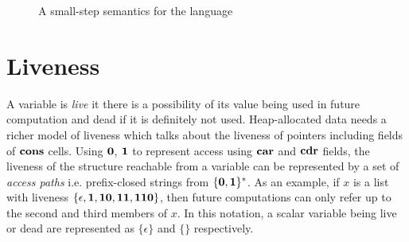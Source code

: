 \documentclass{sig-alternate}
\begin{document}
\begin{figure*}[t!]
\begin{center}
\caption{A small-step semantics for the language}\label{fig:lang-semantics}
\end{center}
\end{figure*}


\renewcommand{\pp}[2]{\ensuremath{#1\!\!:\!#2}} %


\section{Liveness}\label{sec:liveness}

A variable is {\em live} it  there is a possibility of its value being
used  in future computation  and dead  if it  is definitely  not used.
Heap-allocated data needs a richer model of liveness which talks about
the  liveness of pointers  including fields  of $\mbox{$\mathbf{cons}$}$  cells.  Using
$\mathbf{0}$, $\mathbf{1}$  to represent access using $\mbox{$\mathbf{car}$}$  and $\mbox{$\mathbf{cdr}$}$ fields,
the  liveness  of the  structure  reachable  from  a variable  can  be
represented by a set of {\em access paths} i.e.  prefix-closed strings
from $\{\mathbf{0},\mathbf{1}\}^\ast$.   As an  example, if $x$  is a  list with
liveness      $\{\epsilon,     \mathbf{1},      \mathbf{1}\mathbf{0},     \mathbf{1}\mathbf{1},
\mathbf{1}\mathbf{1}\mathbf{0}\}$, then future computations  can only refer up to the
second and third  members of $x$. In this  notation, a scalar variable
being live or dead are represented as $\{\epsilon\}$ and $\{\}$ respectively.
\end{document}
